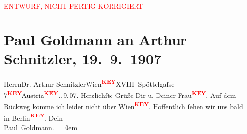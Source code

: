 
\begin{center}
            \textcolor{red}{ENTWURF, NICHT FERTIG KORRIGIERT}
                      \end{center}
            
         \renewcommand{\erwaehnteOrte}{Orte: Berlin, Wien}
         \renewcommand{\erwaehnteWerke}{}
               \section[Paul Goldmann an Arthur Schnitzler, 19. 9. 1907]{ Paul Goldmann an Arthur Schnitzler, 19. 9. 1907}\nopagebreak{}\rehead{ }\begin{ledgroupsized}[t]{13cm}\normalsize\beginnumbering \toendnotes[C]{\smallbreak\pagebreak[2]} 
\pstart{} Herrn\pend{}\pstart{}Dr. Arthur Schnitzler\pend{}\pstart{}Wien\textcolor{red}{\textsuperscript{\textbf{KEY}}}\pend{}\pstart{}XVIII. Spöttelgaſse 7\textcolor{red}{\textsuperscript{\textbf{KEY}}}\pend{}\pstart{}Austria\textcolor{red}{\textsuperscript{\textbf{KEY}}}.\pend{}{\pb}. 9. 07. \pend
           \pstart
           Herzlichſte Grüße Dir u. Deiner Frau\textcolor{red}{\textsuperscript{\textbf{KEY}}}. Auf dem
               Rückweg komme ich leider nicht über Wien\textcolor{red}{\textsuperscript{\textbf{KEY}}}. Hoffentlich
               ſehen wir uns bald in Berlin\textcolor{red}{\textsuperscript{\textbf{KEY}}}.\pend
           \pstart
           Dein{\\[\baselineskip]}\spacefill\mbox{Paul Goldmann. }\pend
           \leftskip=0em{}
         
         \endnumbering{}\end{ledgroupsized}\begin{anhang}\end{anhang}\newcommand{\dateiname}{L03259}\newcommand{\titel}{Paul Goldmann an Arthur Schnitzler, 19. 9. 1907}\newcommand{\editorInnen}{Martin Anton Müller und Laura Untner}
      